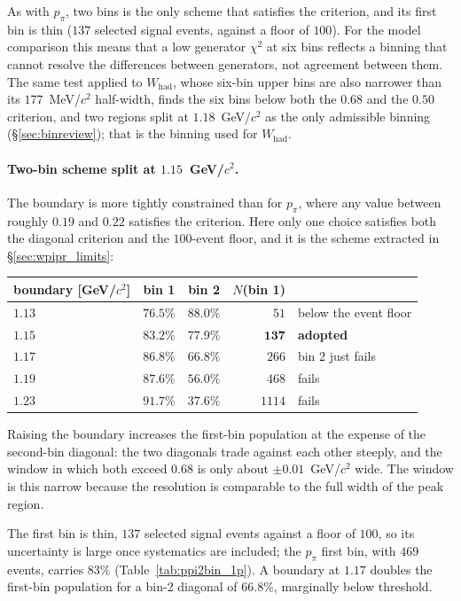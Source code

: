 \documentclass[11pt,a4paper]{article}
\begin{document}
\noindent As with $p_\pi$, two bins is the only scheme that satisfies the criterion, and
its first bin is thin ($137$ selected signal events, against a floor of $100$). For the
model comparison this means that a low generator $\chi^2$ at six bins reflects a binning
that cannot resolve the differences between generators, not agreement between them. The
same test applied to $W_\mathrm{had}$, whose six-bin upper bins are also narrower than its
$177$~MeV/$c^2$ half-width, finds the six bins below both the $0.68$ and the $0.50$
criterion, and two regions split at $1.18$~GeV/$c^2$ as the only admissible binning
(\S\ref{sec:binreview}); that is the binning used for $W_\mathrm{had}$.

\paragraph{Two-bin scheme split at $1.15$~GeV/$c^2$.} The boundary is more tightly
constrained than for $p_\pi$, where any value between roughly $0.19$ and $0.22$ satisfies
the criterion. Here only one choice satisfies both the diagonal criterion and the
$100$-event floor, and it is the scheme extracted in \S\ref{sec:wpipr_limits}:

\begin{center}\small
\begin{tabular}{lccr l}
\toprule
boundary [GeV/$c^2$] & bin 1 & bin 2 & $N$(bin 1) & \\\midrule
$1.13$          & $76.5\%$ & $88.0\%$ & $51$   & below the event floor \\
$\mathbf{1.15}$ & $\mathbf{83.2\%}$ & $\mathbf{77.9\%}$ & $\mathbf{137}$ & \textbf{adopted} \\
$1.17$          & $86.8\%$ & $66.8\%$ & $266$  & bin 2 just fails \\
$1.19$          & $87.6\%$ & $56.0\%$ & $468$  & fails \\
$1.23$          & $91.7\%$ & $37.6\%$ & $1114$ & fails \\
\bottomrule
\end{tabular}
\end{center}

\noindent Raising the boundary increases the first-bin population at the expense of the
second-bin diagonal: the two diagonals trade against each other steeply, and the window in
which both exceed $0.68$ is only about $\pm0.01$~GeV/$c^2$ wide. The window is this narrow
because the resolution is comparable to the full width of the peak region.

The first bin is thin, $137$ selected signal events against a floor of $100$, so its
uncertainty is large once systematics are included; the $p_\pi$ first bin, with $469$
events, carries $83\%$ (Table~\ref{tab:ppi2bin_1p}). A boundary at $1.17$ doubles
the first-bin population for a bin-2 diagonal of $66.8\%$, marginally below threshold.
\end{document}

